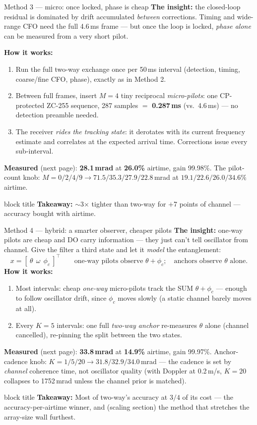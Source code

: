 \documentclass[aspectratio=169,10pt]{beamer}
\newcommand{\takeaway}[1]{%
  \vspace{2pt}\begin{beamercolorbox}[rounded=true,sep=4pt]{block title}%
  \small\textbf{Takeaway:} #1\end{beamercolorbox}}
\begin{document}
\begin{frame}{Method 3 --- micro: once locked, phase is cheap}
  \small\textbf{The insight:} the closed-loop residual is dominated by
  drift accumulated \emph{between} corrections. Timing and wide-range
  CFO need the full 4.6\,ms frame --- but once the loop is locked,
  \emph{phase alone} can be measured from a very short pilot.
  \par\medskip
  \textbf{How it works:}
  \begin{enumerate}
    \item Run the full two-way exchange once per 50\,ms interval
      (detection, timing, coarse/fine CFO, phase), exactly as in
      Method 2.
    \item Between full frames, insert $M{=}4$ tiny reciprocal
      \emph{micro-pilots}: one CP-protected ZC-255 sequence, 287
      samples $=$ \textbf{0.287\,ms} (vs.\ 4.6\,ms) --- no detection
      preamble needed.
    \item The receiver \emph{rides the tracking state}: it derotates
      with its current frequency estimate and correlates at the
      expected arrival time. Corrections issue every sub-interval.
  \end{enumerate}
  \textbf{Measured} (next page): \textbf{28.1\,mrad} at
  \textbf{26.0\%} airtime, gain 99.98\%. The pilot-count knob:
  $M{=}0/2/4/9 \to 71.5/35.3/27.9/22.8$\,mrad at
  $19.1/22.6/26.0/34.6\%$ airtime.
  \takeaway{$\sim$3$\times$ tighter than two-way for $+$7 points of
  channel --- accuracy bought with airtime.}
\end{frame}

\begin{frame}{Method 4 --- hybrid: a smarter observer, cheaper pilots}
  \small\textbf{The insight:} one-way pilots are cheap and DO carry
  information --- they just can't tell oscillator from channel. Give
  the filter a third state and let it \emph{model} the entanglement:
  \[
    x = [\ \theta\ \ \omega\ \ \phi_c\ ]^\top
    \qquad\text{one-way pilots observe } \theta+\phi_c;\quad
    \text{anchors observe } \theta \text{ alone.}
  \]
  \textbf{How it works:}
  \begin{enumerate}
    \item Most intervals: cheap \emph{one-way} micro-pilots track the
      SUM $\theta+\phi_c$ --- enough to follow oscillator drift,
      since $\phi_c$ moves slowly (a static channel barely moves at
      all).
    \item Every $K{=}5$ intervals: one full \emph{two-way anchor}
      re-measures $\theta$ alone (channel cancelled), re-pinning the
      split between the two states.
  \end{enumerate}
  \textbf{Measured} (next page): \textbf{33.8\,mrad} at
  \textbf{14.9\%} airtime, gain 99.97\%. Anchor-cadence knob:
  $K{=}1/5/20 \to 31.8/32.9/34.0$\,mrad --- the cadence is set by
  \emph{channel} coherence time, not oscillator quality (with
  Doppler at 0.2\,m/s, $K{=}20$ collapses to 1752\,mrad unless the
  channel prior is matched).
  \takeaway{Most of two-way's accuracy at $3/4$ of its cost --- the
  accuracy-per-airtime winner, and (scaling section) the method that
  stretches the array-size wall furthest.}
\end{frame}
\end{document}
